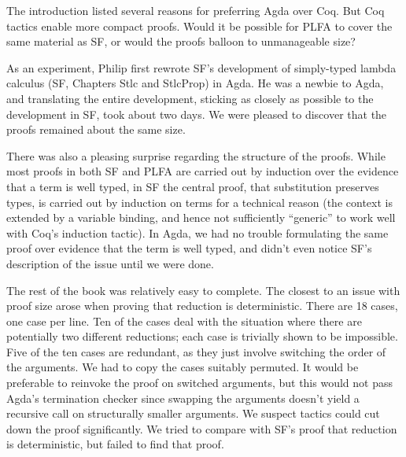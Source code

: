 \documentclass[preprint,authoryear]{elsarticle}
\begin{document}
The introduction listed several reasons for preferring Agda over Coq.
But Coq tactics enable more compact proofs. Would it be possible for
PLFA to cover the same material as SF, or would the proofs
balloon to unmanageable size?

As an experiment, Philip first rewrote SF's development of simply-typed lambda
calculus (SF, Chapters Stlc and StlcProp) in Agda.  He was a newbie to Agda, and
translating the entire development, sticking as closely as possible to the
development in SF, took about two days.  We were pleased to discover that the
proofs remained about the same size.

There was also a pleasing surprise regarding the structure of the
proofs. While most proofs in both SF and PLFA are carried out by
induction over the evidence that a term is well typed, in SF the
central proof, that substitution preserves types, is carried out by
induction on terms for a technical reason
(the context is extended by a variable binding, and hence not
sufficiently ``generic'' to work well with Coq's induction tactic). In
Agda, we had no trouble formulating the same proof over evidence that
the term is well typed, and didn't even notice SF's description of the
issue until we were done.

The rest of the book was relatively easy to complete.  The closest to
an issue with proof size arose when proving that reduction is
deterministic.  There are 18 cases, one case per line.  Ten of the
cases deal with the situation where there are potentially two
different reductions; each case is trivially shown to be
impossible.  Five of the ten cases are redundant, as they just involve
switching the order of the arguments.  We had to copy the cases
suitably permuted. It would be preferable to reinvoke the proof on
switched arguments, but this would not pass Agda's termination checker
since swapping the arguments doesn't yield a recursive call on
structurally smaller arguments.  We suspect tactics could cut down the
proof significantly. We tried to compare with SF's proof that reduction
is deterministic, but failed to find that proof.
\end{document}
